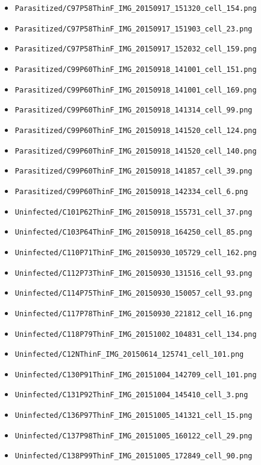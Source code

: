 \begin{itemize}
\item \texttt{Parasitized/C97P58ThinF\_IMG\_20150917\_151320\_cell\_154.png}
\item \texttt{Parasitized/C97P58ThinF\_IMG\_20150917\_151903\_cell\_23.png}
\item \texttt{Parasitized/C97P58ThinF\_IMG\_20150917\_152032\_cell\_159.png}
\item \texttt{Parasitized/C99P60ThinF\_IMG\_20150918\_141001\_cell\_151.png}
\item \texttt{Parasitized/C99P60ThinF\_IMG\_20150918\_141001\_cell\_169.png}
\item \texttt{Parasitized/C99P60ThinF\_IMG\_20150918\_141314\_cell\_99.png}
\item \texttt{Parasitized/C99P60ThinF\_IMG\_20150918\_141520\_cell\_124.png}
\item \texttt{Parasitized/C99P60ThinF\_IMG\_20150918\_141520\_cell\_140.png}
\item \texttt{Parasitized/C99P60ThinF\_IMG\_20150918\_141857\_cell\_39.png}
\item \texttt{Parasitized/C99P60ThinF\_IMG\_20150918\_142334\_cell\_6.png}
\item \texttt{Uninfected/C101P62ThinF\_IMG\_20150918\_155731\_cell\_37.png}
\item \texttt{Uninfected/C103P64ThinF\_IMG\_20150918\_164250\_cell\_85.png}
\item \texttt{Uninfected/C110P71ThinF\_IMG\_20150930\_105729\_cell\_162.png}
\item \texttt{Uninfected/C112P73ThinF\_IMG\_20150930\_131516\_cell\_93.png}
\item \texttt{Uninfected/C114P75ThinF\_IMG\_20150930\_150057\_cell\_93.png}
\item \texttt{Uninfected/C117P78ThinF\_IMG\_20150930\_221812\_cell\_16.png}
\item \texttt{Uninfected/C118P79ThinF\_IMG\_20151002\_104831\_cell\_134.png}
\item \texttt{Uninfected/C12NThinF\_IMG\_20150614\_125741\_cell\_101.png}
\item \texttt{Uninfected/C130P91ThinF\_IMG\_20151004\_142709\_cell\_101.png}
\item \texttt{Uninfected/C131P92ThinF\_IMG\_20151004\_145410\_cell\_3.png}
\item \texttt{Uninfected/C136P97ThinF\_IMG\_20151005\_141321\_cell\_15.png}
\item \texttt{Uninfected/C137P98ThinF\_IMG\_20151005\_160122\_cell\_29.png}
\item \texttt{Uninfected/C138P99ThinF\_IMG\_20151005\_172849\_cell\_90.png}

\end{itemize}
